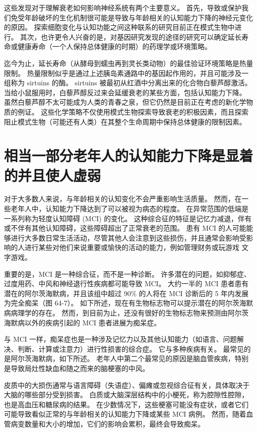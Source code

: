 这些发现对于理解衰老如何影响神经系统有两个主要意义。 首先，导致或保护我们免受年龄破坏的生化机制很可能是导致与年龄相关的认知能力下降的神经元变化的原因。 探索细胞变化与认知功能之间这种联系的研究目前正在模式生物中进行。 其次，也许更令人兴奋的是，对基因研究发现的途径的研究可以确定延长寿命或健康寿命（一个人保持总体健康的时期）的药理学或环境策略。

迄今为止，延长寿命（从酵母到蠕虫再到灵长类动物）的最佳验证环境策略是热量限制。 热量限制似乎是通过上述胰岛素通路中的基因起作用的，并且可能涉及一组称为 sirtuins 的酶。 sirtuins 被最初从红酒中分离出来的化合物白藜芦醇激活。 当给小鼠服用时，白藜芦醇反过来会延缓衰老的某些方面，包括认知能力下降。 虽然白藜芦醇不太可能成为人类的青春之泉，但它仍然是目前正在考虑的新化学物质的例证。 这些化学策略不仅使用模式生物探索导致衰老的积极因素，而且探索阻止模式生物（可能还有人类）在其整个生命周期中保持总体健康的限制因素。

\section{相当一部分老年人的认知能力下降是显着的并且使人虚弱}

对于大多数人来说，与年龄相关的认知变化不会严重影响生活质量。 然而，在一些老年人中，认知能力下降达到了可以被视为病态的程度。 在异常范围的低端是一系列称为轻度认知障碍 (MCI) 的变化。 这种综合征的特征是记忆力减退，伴有或不伴有其他认知障碍，这些障碍超出了正常衰老的范围。 患有 MCI 的人可能能够进行大多数日常生活活动，尽管其他人会注意到这些损伤，并且通常会影响受影响的人进行某些对他们来说重要或愉快的活动的能力，例如管理财务或玩游戏 文字游戏。

重要的是，MCI 是一种综合征，而不是一种诊断。 许多潜在的问题，如抑郁症、过度用药、中风和神经退行性疾病都可能导致 MCI。 大约一半的 MCI 患者患有潜在的阿尔茨海默病，并且该组中超过 90\% 的人将在 MCI 诊断后的 5 年内发展为完全痴呆（图 64-7）。 如下所述，现在有生物标志物可以提示潜在的阿尔茨海默病病理学的存在。 然而，到目前为止，还没有很好的生物标志物来预测由阿尔茨海默病以外的疾病引起的 MCI 患者进展为痴呆症。

与 MCI 一样，痴呆症也是一种涉及记忆力以及其他认知能力（如语言、问题解决、判断、计算或注意力）进行性损害的综合症。 它与多种疾病有关。 最常见的是阿尔茨海默病，如下所述。 老年人中第二个最常见的原因是脑血管疾病，特别是导致局灶性缺血和随之而来的脑梗塞的中风。

皮质中的大损伤通常与语言障碍（失语症）、偏瘫或忽视综合征有关，具体取决于大脑的哪些部分受到损害。 白质或大脑深层结构中的小梗死，称为腔隙性腔隙，也是高血压和糖尿病的结果。 在少数情况下，这些梗塞可能没有症状，或者它们可能导致看似正常的与年龄相关的认知能力下降或某些 MCI 病例。 然而，随着血管病变数量和大小的增加，它们的影响会累积，最终会导致痴呆。

